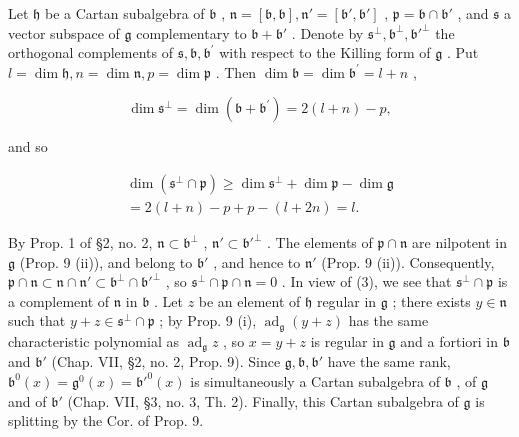 Let \(\mathfrak{h}\) be a Cartan subalgebra of \(\mathfrak{b}\) , \(\mathfrak{n} = [\mathfrak{b},\mathfrak{b}],\mathfrak{n}' = [\mathfrak{b}',\mathfrak{b}']\) , \(\mathfrak{p} = \mathfrak{b}\cap \mathfrak{b}'\) , and \(\mathfrak{s}\) a vector subspace of \(\mathfrak{g}\) complementary to \(\mathfrak{b} + \mathfrak{b}'\) . Denote by \(\mathfrak{s}^{\perp},\mathfrak{b}^{\perp},\mathfrak{b}'^{\perp}\) the orthogonal complements of \(\mathfrak{s},\mathfrak{b},\mathfrak{b}^{\prime}\) with respect to the Killing form of \(\mathfrak{g}\) . Put \(l = \dim \mathfrak{h}, n = \dim \mathfrak{n}, p = \dim \mathfrak{p}\) . Then \(\dim \mathfrak{b} = \dim \mathfrak{b}^{\prime} = l + n\) ,

\[
\dim \mathfrak {s} ^ {\perp} = \dim (\mathfrak {b} + \mathfrak {b} ^ {\prime}) = 2 (l + n) - p,
\]

and so

\[
\begin{array}{c} \dim (\mathfrak {s} ^ {\perp} \cap \mathfrak {p}) \geq \dim \mathfrak {s} ^ {\perp} + \dim \mathfrak {p} - \dim \mathfrak {g} \\ = 2 (l + n) - p + p - (l + 2 n) = l. \end{array}\tag{3}
\]

By Prop. 1 of §2, no. 2, \(\mathfrak{n} \subset \mathfrak{b}^{\perp}\) , \(\mathfrak{n}' \subset \mathfrak{b}'^{\perp}\) . The elements of \(\mathfrak{p} \cap \mathfrak{n}\) are nilpotent in \(\mathfrak{g}\) (Prop. 9 (ii)), and belong to \(\mathfrak{b}'\) , and hence to \(\mathfrak{n}'\) (Prop. 9 (ii)). Consequently, \(\mathfrak{p} \cap \mathfrak{n} \subset \mathfrak{n} \cap \mathfrak{n}' \subset \mathfrak{b}^{\perp} \cap \mathfrak{b}'^{\perp}\) , so \(\mathfrak{s}^{\perp} \cap \mathfrak{p} \cap \mathfrak{n} = 0\) . In view of (3), we see that \(\mathfrak{s}^{\perp} \cap \mathfrak{p}\) is a complement of \(\mathfrak{n}\) in \(\mathfrak{b}\) . Let \(z\) be an element of \(\mathfrak{h}\) regular in \(\mathfrak{g}\) ; there exists \(y \in \mathfrak{n}\) such that \(y + z \in \mathfrak{s}^{\perp} \cap \mathfrak{p}\) ; by Prop. 9 (i), \(\operatorname{ad}_{\mathfrak{g}}(y + z)\) has the same characteristic polynomial as \(\operatorname{ad}_{\mathfrak{g}}z\) , so \(x = y + z\) is regular in \(\mathfrak{g}\) and a fortiori in \(\mathfrak{b}\) and \(\mathfrak{b}'\) (Chap. VII, §2, no. 2, Prop. 9). Since \(\mathfrak{g}, \mathfrak{b}, \mathfrak{b}'\) have the same rank, \(\mathfrak{b}^{0}(x) = \mathfrak{g}^{0}(x) = \mathfrak{b}'^{0}(x)\) is simultaneously a Cartan subalgebra of \(\mathfrak{b}\) , of \(\mathfrak{g}\) and of \(\mathfrak{b}'\) (Chap. VII, §3, no. 3, Th. 2). Finally, this Cartan subalgebra of \(\mathfrak{g}\) is splitting by the Cor. of Prop. 9.

